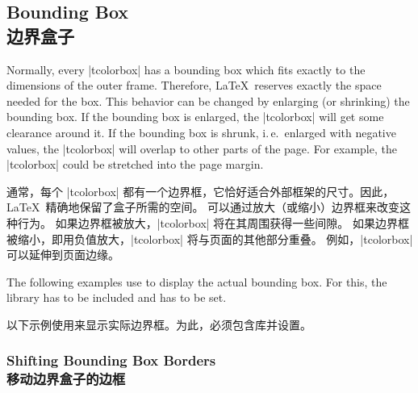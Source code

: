 \subsection{Bounding Box\\边界盒子}

Normally, every |tcolorbox| has a bounding box which fits exactly to the
dimensions of the outer frame. Therefore, \LaTeX\ reserves exactly the space
needed for the box.
This behavior can be changed by enlarging (or shrinking) the bounding box.
If the bounding box is enlarged, the |tcolorbox| will get some clearance
around it. If the bounding box is shrunk, i.\,e.\ enlarged with negative
values, the |tcolorbox| will overlap to other parts of the page.
For example, the |tcolorbox| could be stretched into the page margin.

通常，每个 |tcolorbox| 都有一个边界框，它恰好适合外部框架的尺寸。因此，\LaTeX\ 精确地保留了盒子所需的空间。 可以通过放大（或缩小）边界框来改变这种行为。 如果边界框被放大，|tcolorbox| 将在其周围获得一些间隙。 如果边界框被缩小，即用负值放大，|tcolorbox| 将与页面的其他部分重叠。 例如，|tcolorbox| 可以延伸到页面边缘。


\begin{marker}
The following examples use  to display the actual bounding box. For this, the library  has to be included and  has to be set.

以下示例使用来显示实际边界框。为此，必须包含库并设置。
\end{marker}



\subsubsection{Shifting Bounding Box Borders\\移动边界盒子的边框}

